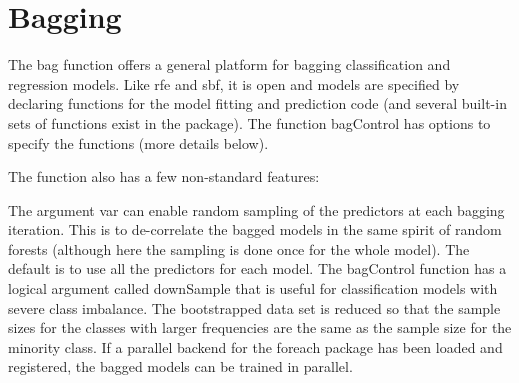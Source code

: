 \section{Bagging}

The bag function offers a general platform for bagging classification and regression models. Like rfe and sbf, it is open and models are specified by declaring functions for the model fitting and prediction code (and several built-in sets of functions exist in the package). The function bagControl has options to specify the functions (more details below).

The function also has a few non-standard features:

The argument var can enable random sampling of the predictors at each bagging iteration. This is to de-correlate the bagged models in the same spirit of random forests (although here the sampling is done once for the whole model). The default is to use all the predictors for each model.
The bagControl function has a logical argument called downSample that is useful for classification models with severe class imbalance. The bootstrapped data set is reduced so that the sample sizes for the classes with larger frequencies are the same as the sample size for the minority class.
If a parallel backend for the foreach package has been loaded and registered, the bagged models can be trained in parallel.




